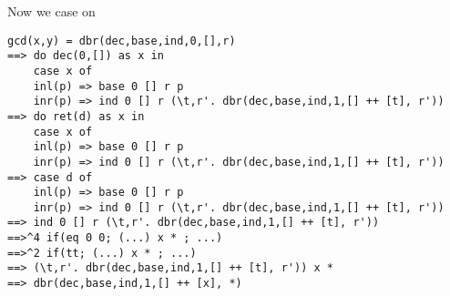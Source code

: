 Now we case on 

\begin{verbatim}
gcd(x,y) = dbr(dec,base,ind,0,[],r) 
==> do dec(0,[]) as x in 
    case x of
    inl(p) => base 0 [] r p 
    inr(p) => ind 0 [] r (\t,r'. dbr(dec,base,ind,1,[] ++ [t], r')) 
==> do ret(d) as x in 
    case x of
    inl(p) => base 0 [] r p 
    inr(p) => ind 0 [] r (\t,r'. dbr(dec,base,ind,1,[] ++ [t], r')) 
==> case d of
    inl(p) => base 0 [] r p 
    inr(p) => ind 0 [] r (\t,r'. dbr(dec,base,ind,1,[] ++ [t], r')) 
==> ind 0 [] r (\t,r'. dbr(dec,base,ind,1,[] ++ [t], r')) 
==>^4 if(eq 0 0; (...) x * ; ...)
==>^2 if(tt; (...) x * ; ...)
==> (\t,r'. dbr(dec,base,ind,1,[] ++ [t], r')) x * 
==> dbr(dec,base,ind,1,[] ++ [x], *)
\end{verbatim}


